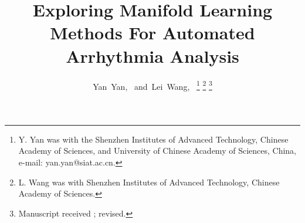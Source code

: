 \documentclass[journal]{IEEEtran}
\begin{document}
%
\title{Exploring Manifold Learning Methods For Automated Arrhythmia Analysis}

%
%
%

\author{Yan~Yan,~
        and~Lei~Wang,~%
\thanks{Y. Yan was with the Shenzhen Institutes of Advanced Technology, Chinese Academy of Sciences, and University of Chinese Academy of Sciences, China, e-mail: yan.yan@siat.ac.cn.}%
\thanks{L. Wang was with Shenzhen Institutes of Advanced Technology, Chinese Academy of Sciences.}%
\thanks{Manuscript received ; revised.}}

% 
%
\end{document}
